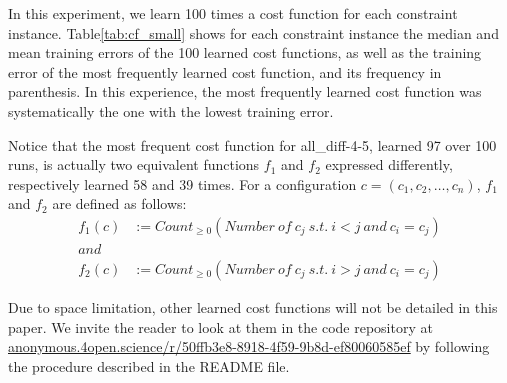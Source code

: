 \documentclass{article}
\begin{document}

In  this experiment,  we  learn 100  times a  cost  function for  each
constraint instance. Table\ref{tab:cf_small} shows for each constraint
instance the median  and mean training errors of the  100 learned cost
functions,  as well  as  the  training error  of  the most  frequently
learned  cost function,  and  its frequency  in  parenthesis. In  this
experience,   the   most   frequently  learned   cost   function   was
systematically the one with the lowest training error.

Notice that the most frequent cost function for all\_diff-4-5, learned
97 over 100 runs, is actually two equivalent functions $f_1$ and $f_2$
expressed differently,  respectively learned 58  and 39 times.   For a
configuration  $c =  (c_1, c_2,  \ldots,  c_n)$, $f_1$  and $f_2$  are
defined as follows:
\begin{align*}
  f_1(c) &:= Count_{\geq 0}( Number\ of\ c_j\ s.t.\ i<j\ and\ c_i=c_j)\\
  and&\\
  f_2(c) &:= Count_{\geq 0}( Number\ of\ c_j\ s.t.\ i>j\ and\ c_i=c_j)
\end{align*}

Due  to space  limitation, other  learned cost  functions will  not be
detailed in this paper.   We invite the reader to look  at them in the
code                           repository                           at
\href{https://anonymous.4open.science/r/50ffb3e8-8918-4f59-9b8d-ef80060585ef/}{anonymous.4open.science/r/50ffb3e8-8918-4f59-9b8d-ef80060585ef}
by following the procedure described in the README file.


\end{document}
